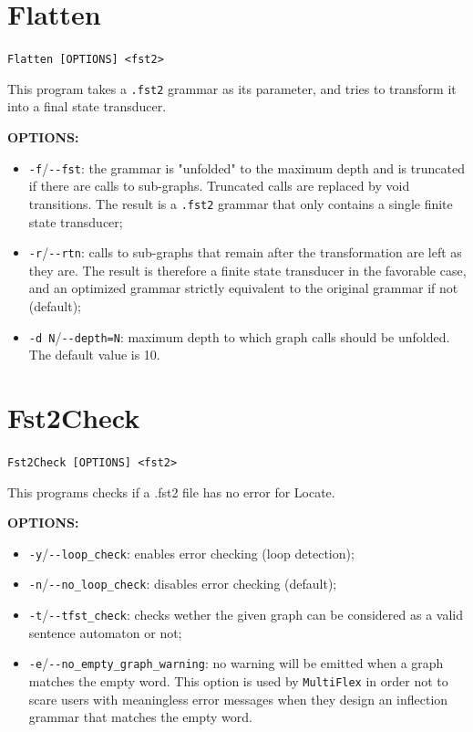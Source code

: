 \section{Flatten}
\verb+Flatten [OPTIONS] <fst2>+

\bigskip
\noindent This program takes a \verb+.fst2+ grammar as its parameter, and tries to
transform it into a final state transducer. 

\bigskip
\noindent \textbf{OPTIONS:}
\begin{itemize}
  \item \verb+-f+/\verb+--fst+: the grammar is "unfolded" to the maximum depth 
  and is truncated if there are calls to
  sub-graphs. Truncated calls are replaced by void transitions. The result is a
  \verb+.fst2+ grammar that only contains a single finite state transducer;

  \item \verb+-r+/\verb+--rtn+: calls to sub-graphs that remain
  after the transformation are left as they are. The result is therefore a
  finite state transducer in the favorable case, and an optimized grammar
  strictly equivalent to the original grammar if not (default);

  \item \verb+-d N+/\verb+--depth=N+: maximum depth to which graph calls should 
  be unfolded. The default value is 10.
\end{itemize}







\section{Fst2Check}
\verb+Fst2Check [OPTIONS] <fst2>+

\bigskip
\noindent This programs checks if a .fst2 file has no error for Locate.

\bigskip
\noindent \textbf{OPTIONS:}
\begin{itemize}
  \item \verb+-y+/\verb+--loop_check+: enables error checking (loop
  detection);
  \item \verb+-n+/\verb+--no_loop_check+: disables error checking (default);
  \item \verb+-t+/\verb+--tfst_check+: checks wether the given graph can be
  considered as a valid sentence automaton or not;
  \item \verb+-e+/\verb+--no_empty_graph_warning+: no warning will be emitted
  when a graph matches the empty word. This option is used by \verb+MultiFlex+
  in order not to scare users with meaningless error messages when they design
  an inflection grammar that matches the empty word.
\end{itemize}

